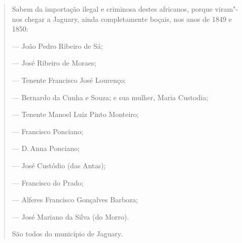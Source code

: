 \begin{quote}
Sabem da importação ilegal e criminosa destes africanos, porque
viram"-nos chegar a Jaguary, ainda completamente boçais, nos anos de 1849
e 1850:

--- João Pedro Ribeiro de Sá;

--- José Ribeiro de Moraes;

--- Tenente Francisco José Lourenço;

--- Bernardo da Cunha e Souza; e sua mulher, Maria Custodia;

--- Tenente Manoel Luiz Pinto Monteiro;

--- Francisco Ponciano;

--- D.\,Anna Ponciano;

--- José Custódio (das Antas);

--- Francisco do Prado;

--- Alferes Francisco Gonçalves Barboza;

--- José Mariano da Silva (do Morro).

São todos do município de Jaguary.


\end{quote}
